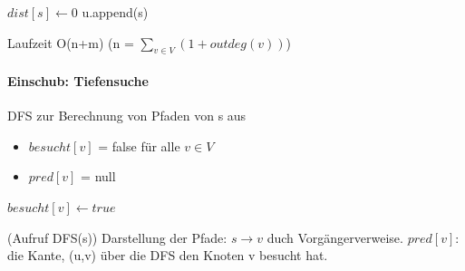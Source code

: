 \begin{algorithm}[H]
\SetAlgoLined
$dist[s] \gets 0$ \; 
u.append(s)\;
\caption{BFS(s)}
\end{algorithm}
Laufzeit O(n+m) (n = $ \sum_{v\in V} (1+ outdeg(v)) $)


\paragraph{Einschub: Tiefensuche} DFS zur Berechnung von Pfaden von s aus


\begin{itemize}
    \item $besucht[v]$ = false für alle $ v \in V $
    \item $pred[v]$ = null
\end{itemize}


\begin{algorithm}[H]
\SetAlgoLined
$besucht[v] \gets true$ \;
\caption{DFS(v)}
\end{algorithm}
(Aufruf DFS(s))
Darstellung der Pfade: $ s\rightarrow v $ duch Vorgängerverweise. $pred[v]$: die Kante, (u,v) über die DFS den Knoten v besucht hat.

























